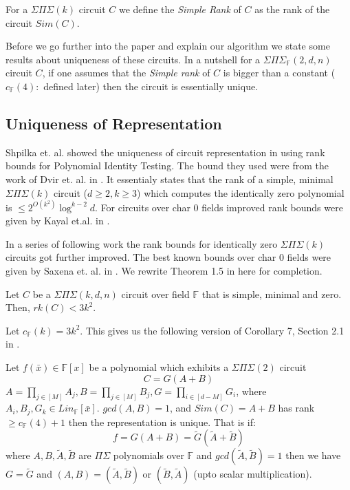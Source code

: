 \documentclass[letterpaper,USenglish,numberwithinsect]{lipics}
\newcommand{\F}{\mathbb{F}}
\newcommand{\B}[1]{\bar{#1}}
\newcommand{\ti}[1]{\tilde{#1}}
\begin{document}
\begin{definition}
 For a $\Sigma\Pi\Sigma(k)$ circuit $C$ we define the \emph{Simple Rank} of $C$ as the
 rank of the circuit $Sim(C)$.
\end{definition}


Before we go further into the paper and explain our algorithm we state some results about
uniqueness of these circuits. In a nutshell for a $\Sigma\Pi\Sigma_\F(2,d,n)$ circuit $C$,  if one assumes
that the \emph{Simple rank} of $C$ is bigger than a constant ($c_\F(4) :$ defined later) then the circuit is essentially unique.

\subsection{Uniqueness of Representation}

Shpilka et. al. showed the uniqueness of circuit representation in
\cite{Shpilka07} using rank bounds for Polynomial Identity Testing. The bound they used were from
the work of Dvir et. al. in \cite{DS07}. It essentialy states that
the rank of a simple, minimal $\Sigma\Pi\Sigma(k)$ circuit ($d\geq 2, k\geq 3$) which computes the identically zero polynomial
is $\leq 2^{O(k^2)}\log^{k-2}d$. For circuits over char $0$ fields improved rank bounds were given by Kayal et.al. in \cite{KayalSa09}.

In a series of following work the rank bounds for identically zero $\Sigma\Pi\Sigma(k)$ circuits got further improved. The best known bounds over
char $0$ fields were given by Saxena et. al. in \cite{SS10}. We rewrite Theorem 1.5 in \cite{SS10} here for completion.


\begin{theorem} \label{rankbound}
Let $C$ be a $\Sigma\Pi\Sigma(k,d,n)$ circuit over field $\F$ that is simple, minimal and zero. Then, $rk(C) < 3k^2$.
\end{theorem}
Let $c_{\F}(k) = 3k^2$. This gives us the following version of Corollary 7, Section 2.1 in
\cite{Shpilka07}.

\begin{theorem}\label{uniqueness}
 Let $f(\B{x})\in \F[x]$ be a polynomial which exhibits a $\Sigma\Pi\Sigma(2)$
circuit
 \[
 C = G(A + B)
 \]
 $A = \prod\limits_{j\in [M]} A_j, B=\prod\limits_{j\in [M]} B_j, G =
\prod\limits_{i\in [d-M]} G_i$, where $A_i,B_j,G_k \in Lin_{\F}[\B{x}]$.
 $gcd(A, B)=1$, and $Sim(C) = A+B$ has rank $\geq c_{\F}(4) +1$ then the
 representation is unique. That is if:
 \[
 f=G(A+B) = \ti{G}(\ti{A} + \ti{B})
 \]
 where $A,B,\ti{A},\ti{B}$ are $\Pi\Sigma$ polynomials over $\F$ and
$gcd(\ti{A},\ti{B})=1$ then we have $G = \ti{G}$ and
 $(A,B)=(\ti{A},\ti{B})$ or $(\ti{B},\ti{A})$ (upto scalar multiplication).
\end{theorem}
\end{document}
